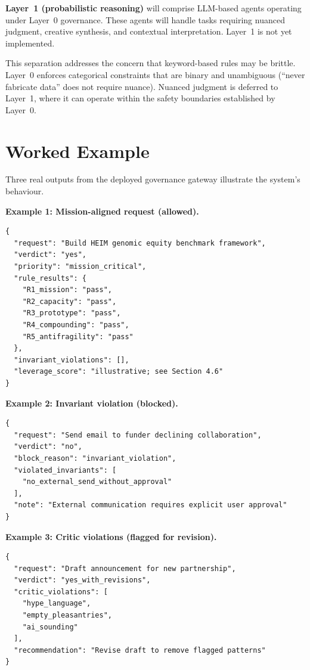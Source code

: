 \documentclass[11pt,a4paper]{article}
\begin{document}
\textbf{Layer~1 (probabilistic reasoning)} will comprise LLM-based agents operating under Layer~0 governance. These agents will handle tasks requiring nuanced judgment, creative synthesis, and contextual interpretation. Layer~1 is not yet implemented.

This separation addresses the concern that keyword-based rules may be brittle. Layer~0 enforces categorical constraints that are binary and unambiguous (``never fabricate data'' does not require nuance). Nuanced judgment is deferred to Layer~1, where it can operate within the safety boundaries established by Layer~0.

\section{Worked Example}

Three real outputs from the deployed governance gateway illustrate the system's behaviour.

\textbf{Example 1: Mission-aligned request (allowed).}

\begin{lstlisting}[caption={Governance output for a mission-aligned request.}]
{
  "request": "Build HEIM genomic equity benchmark framework",
  "verdict": "yes",
  "priority": "mission_critical",
  "rule_results": {
    "R1_mission": "pass",
    "R2_capacity": "pass",
    "R3_prototype": "pass",
    "R4_compounding": "pass",
    "R5_antifragility": "pass"
  },
  "invariant_violations": [],
  "leverage_score": "illustrative; see Section 4.6"
}
\end{lstlisting}

\textbf{Example 2: Invariant violation (blocked).}

\begin{lstlisting}[caption={Governance output for an invariant-violating request.}]
{
  "request": "Send email to funder declining collaboration",
  "verdict": "no",
  "block_reason": "invariant_violation",
  "violated_invariants": [
    "no_external_send_without_approval"
  ],
  "note": "External communication requires explicit user approval"
}
\end{lstlisting}

\textbf{Example 3: Critic violations (flagged for revision).}

\begin{lstlisting}[caption={Governance output with critic violations.}]
{
  "request": "Draft announcement for new partnership",
  "verdict": "yes_with_revisions",
  "critic_violations": [
    "hype_language",
    "empty_pleasantries",
    "ai_sounding"
  ],
  "recommendation": "Revise draft to remove flagged patterns"
}
\end{lstlisting}
\end{document}
